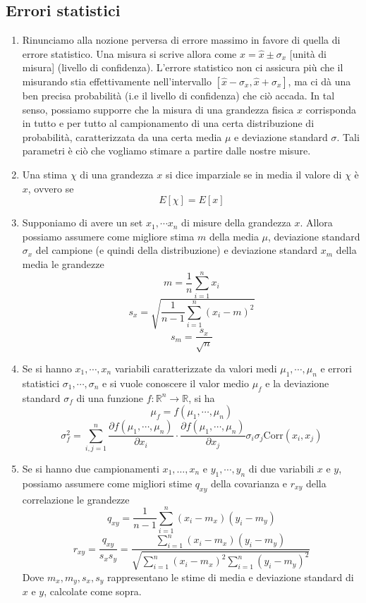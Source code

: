 \documentclass[a4paper,11pt]{article}
\newcommand{\corr}[1]{\textrm{Corr}(#1)}
\begin{document}
\subsection{Errori statistici}
\begin{enumerate}[resume]
	\item Rinunciamo alla nozione perversa di errore massimo in favore di quella di errore statistico. Una misura si scrive allora come $x=\hat{x}\pm\sigma_x$ [unità di misura] (livello di confidenza). L'errore statistico non ci assicura più che il misurando stia effettivamente nell'intervallo $[\hat{x}-\sigma_x,\hat{x}+\sigma_x]$, ma ci dà una ben precisa probabilità (i.e il livello di confidenza) che ciò accada. In tal senso, possiamo supporre che la misura di una grandezza fisica $x$ corrisponda in tutto e per tutto al campionamento di una certa distribuzione di probabilità, caratterizzata da una certa media $\mu$ e deviazione standard $\sigma$. Tali parametri è ciò che vogliamo stimare a partire dalle nostre misure.
	\item Una stima $\chi$ di una grandezza $x$ si dice imparziale se in media il valore di $\chi$ è $x$, ovvero se 
	\[E[\chi]=E[x]\]
	\item Supponiamo di avere un set $x_1,\cdots x_n$ di misure della grandezza $x$. Allora possiamo assumere come migliore stima $m$ della media $\mu$, deviazione standard $\sigma_x$ del campione (e quindi della distribuzione) e deviazione standard $x_m$ della media le grandezze
	\[m=\frac{1}{n}\sum_{i=1}^{n}x_i\]
	\[s_x=\sqrt{\frac{1}{n-1}\sum_{i=1}^{n}\left(x_i-m\right)^2}\]
	\[s_m=\frac{s_x}{\sqrt{n}}\]
	\item Se si hanno $x_1,\cdots,x_n$ variabili caratterizzate da valori medi $\mu_1,\cdots,\mu_n$ e errori statistici $\sigma_1,\cdots,\sigma_n$ e si vuole conoscere il valor medio $\mu_f$ e la deviazione standard $\sigma_f$ di una funzione $f\colon\mathbb{R}^n\to\mathbb{R}$, si ha
	\[\mu_f=f(\mu_1,\cdots,\mu_n)\]
	\[\sigma_f^2=\sum_{i,j=1}^{n}\frac{\partial f(\mu_1,\cdots,\mu_n)}{\partial x_i}\cdot\frac{\partial f(\mu_1,\cdots,\mu_n)}{\partial x_j}\sigma_i\sigma_j\corr{x_i,x_j}\]
	\item Se si hanno due campionamenti $x_1,\dots,x_n$ e $y_1,\cdots,y_n$ di due variabili $x$ e $y$, possiamo assumere come migliori stime $q_{xy}$ della covarianza e $r_{xy}$ della correlazione le grandezze
	\[q_{xy}=\frac{1}{n-1}\sum_{i=1}^{n}(x_i-m_x)(y_i-m_y)\]
	\[r_{xy}=\frac{q_{xy}}{s_xs_y}=\frac{\sum_{i=1}^{n}(x_i-m_x)(y_i-m_y)}{\sqrt{\sum_{i=1}^{n}(x_i-m_x)^2\sum_{i=1}^{n}(y_i-m_y)^2}}\]
	Dove $m_x,m_y,s_x,s_y$ rappresentano le stime di media e deviazione standard di $x$ e $y$, calcolate come sopra.
\end{enumerate}
\end{document}
